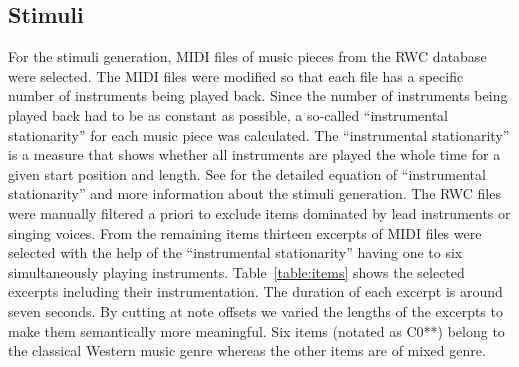 \subsection{Stimuli}\label{sec:stimuli}
For the stimuli generation, MIDI files of music pieces from the RWC database\cite{rwc} were selected. The MIDI files were modified so that each file has a specific number of instruments being played back. Since the number of instruments being played back had to be as constant as possible, a so-called ``instrumental stationarity'' for each music piece was calculated. The ``instrumental stationarity'' is a measure that shows whether all instruments are played the whole time for a given start position and length. See \cite{Stoter2013} for the detailed equation of ``instrumental stationarity'' and more information about the stimuli generation. The RWC files were manually filtered a priori to exclude items dominated by lead instruments or singing voices. From the remaining items thirteen excerpts of MIDI files were selected with the help of the ``instrumental stationarity'' having one to six simultaneously playing instruments. Table~\ref{table:items} shows the selected excerpts including their instrumentation. The duration of each excerpt is around seven seconds. By cutting at note offsets we varied the lengths of the excerpts to make them semantically more meaningful. Six items (notated as C0**) belong to the classical Western music genre whereas the other items are of mixed genre.
\renewcommand{\arraystretch}{1.1}
